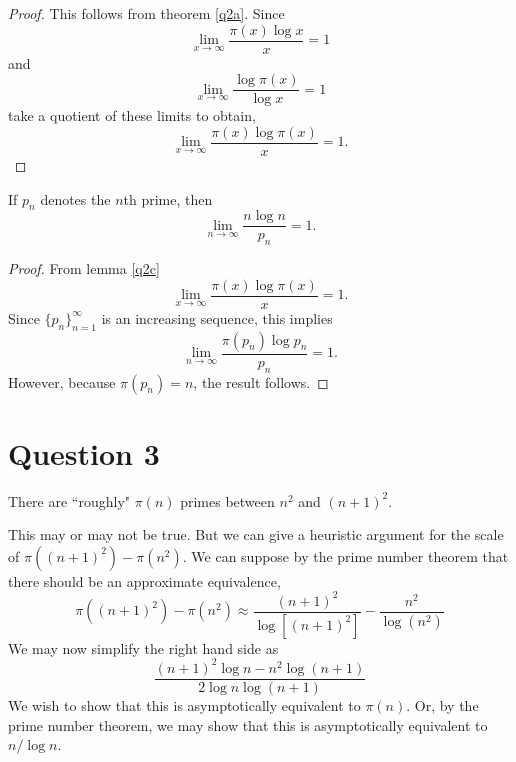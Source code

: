 \documentclass{unswmaths}
\begin{document}
    \begin{proof}
        This follows from theorem \ref{q2a}. Since
        \begin{equation*}
            \lim_{x\rightarrow\infty} \frac{\pi(x)\log{x}}{x} = 1
        \end{equation*}
        and
        \begin{equation*}
            \lim_{x\rightarrow\infty} \frac{\log{\pi(x)}}{\log{x}} = 1
        \end{equation*}
        take a quotient of these limits to obtain,
        \begin{equation*}
            \lim_{x\rightarrow\infty} \frac{\pi(x)\log{\pi(x)}}{x} = 1.
        \end{equation*}
    \end{proof}
    \begin{theorem}
        If $p_n$ denotes the $n$th prime, then
        \begin{equation*}   
            \lim_{n\rightarrow\infty} \frac{n\log{n}}{p_n} = 1.
        \end{equation*}
    \end{theorem}
    \begin{proof}
        From lemma \ref{q2c} 
        \begin{equation*}
            \lim_{x\rightarrow\infty} \frac{\pi(x)\log{\pi(x)}}{x} = 1.
        \end{equation*}
        Since $\{p_n\}_{n=1}^\infty$ is an increasing sequence, this implies
        \begin{equation*}
            \lim_{n\rightarrow\infty} \frac{\pi(p_n)\log{p_n}}{p_n} = 1.
        \end{equation*}
        However, because $\pi(p_n) = n$, the result follows.
    \end{proof}
\section*{Question 3}
    \begin{remark}
        There are ``roughly" $\pi(n)$ primes between $n^2$ and $(n+1)^2$.
    \end{remark}
    This may or may not be true. But we can give a heuristic argument for the scale of $\pi((n+1)^2)-\pi(n^2)$.
    We can suppose by the prime number theorem that there should be an approximate equivalence,
    \begin{equation*}
        \pi((n+1)^2)-\pi(n^2) \approx \frac{(n+1)^2}{\log{[(n+1)^2]}}-\frac{n^2}{\log{(n^2)}}
    \end{equation*}
    We may now simplify the right hand side as
    \begin{equation*}
        \frac{(n+1)^2\log{n}-n^2\log(n+1)}{2\log{n}\log(n+1)}
    \end{equation*}
    We wish to show that this is asymptotically equivalent to $\pi(n)$. Or, by the prime
    number theorem, we may show that this is asymptotically equivalent to $n/\log{n}$.    
    
\end{document}

